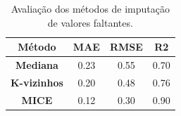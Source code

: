 \begin{table}[!t]
    \renewcommand{\arraystretch}{1.3}
    \caption{Avaliação dos métodos de imputação de valores faltantes.}
    \label{table:imputation}
    \centering
    \begin{tabular}{|c||c||c||c|}
        \hline
        \textbf{Método}     & \textbf{MAE} & \textbf{RMSE} & \textbf{R2} \\ \hline
        \textbf{Mediana}    & 0.23         & 0.55          & 0.70        \\ \hline
        \textbf{K-vizinhos} & 0.20         & 0.48          & 0.76        \\ \hline
        \textbf{MICE}       & 0.12         & 0.30          & 0.90        \\ \hline
    \end{tabular}
\end{table}